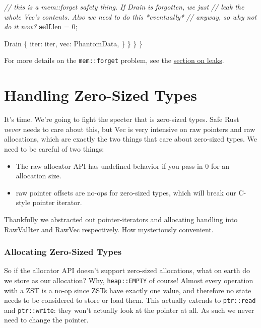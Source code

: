 \documentclass[a4paper,]{book}
\newenvironment{Shaded}{\begin{snugshade}}{\end{snugshade}}
\newcommand{\KeywordTok}[1]{\textcolor[rgb]{0.13,0.29,0.53}{\textbf{{#1}}}}
\newcommand{\DecValTok}[1]{\textcolor[rgb]{0.00,0.00,0.81}{{#1}}}
\newcommand{\CommentTok}[1]{\textcolor[rgb]{0.56,0.35,0.01}{\textit{{#1}}}}
\newcommand{\NormalTok}[1]{{#1}}
\providecommand{\tightlist}{%
  \setlength{\itemsep}{0pt}\setlength{\parskip}{0pt}}
\begin{document}
\begin{Shaded}
\begin{Highlighting}[]
            \CommentTok{// this is a mem::forget safety thing. If Drain is forgotten, we just}
            \CommentTok{// leak the whole Vec's contents. Also we need to do this *eventually*}
            \CommentTok{// anyway, so why not do it now?}
            \KeywordTok{self}\NormalTok{.len = }\DecValTok{0}\NormalTok{;}

            \NormalTok{Drain \{}
                \NormalTok{iter: iter,}
                \NormalTok{vec: PhantomData,}
            \NormalTok{\}}
        \NormalTok{\}}
    \NormalTok{\}}
\NormalTok{\}}
\end{Highlighting}
\end{Shaded}

For more details on the \texttt{mem::forget} problem, see the
\protect\hyperlink{sec--leaking}{section on leaks}.

\section{Handling Zero-Sized Types}\label{sec--vec-zsts}

It's time. We're going to fight the specter that is zero-sized types.
Safe Rust \emph{never} needs to care about this, but Vec is very
intensive on raw pointers and raw allocations, which are exactly the two
things that care about zero-sized types. We need to be careful of two
things:

\begin{itemize}
\tightlist
\item
  The raw allocator API has undefined behavior if you pass in 0 for an
  allocation size.
\item
  raw pointer offsets are no-ops for zero-sized types, which will break
  our C-style pointer iterator.
\end{itemize}

Thankfully we abstracted out pointer-iterators and allocating handling
into RawValIter and RawVec respectively. How mysteriously convenient.

\subsubsection{Allocating Zero-Sized
Types}\label{allocating-zero-sized-types}

So if the allocator API doesn't support zero-sized allocations, what on
earth do we store as our allocation? Why, \texttt{heap::EMPTY} of
course! Almost every operation with a ZST is a no-op since ZSTs have
exactly one value, and therefore no state needs to be considered to
store or load them. This actually extends to \texttt{ptr::read} and
\texttt{ptr::write}: they won't actually look at the pointer at all. As
such we never need to change the pointer.
\end{document}
